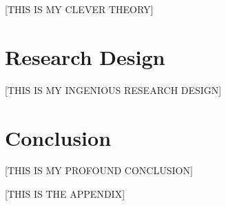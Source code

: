 \documentclass[12pt,letterpaper]{article}
\begin{document}
\begin{center}
[THIS IS MY CLEVER THEORY]
\end{center}


\section{Research Design}

\begin{center}
[THIS IS MY INGENIOUS RESEARCH DESIGN]
\end{center}


\section{Conclusion}

\begin{center}
[THIS IS MY PROFOUND CONCLUSION]
\end{center}

\clearpage




\appendix

\begin{center}
[THIS IS THE APPENDIX]
\end{center}
\end{document}
